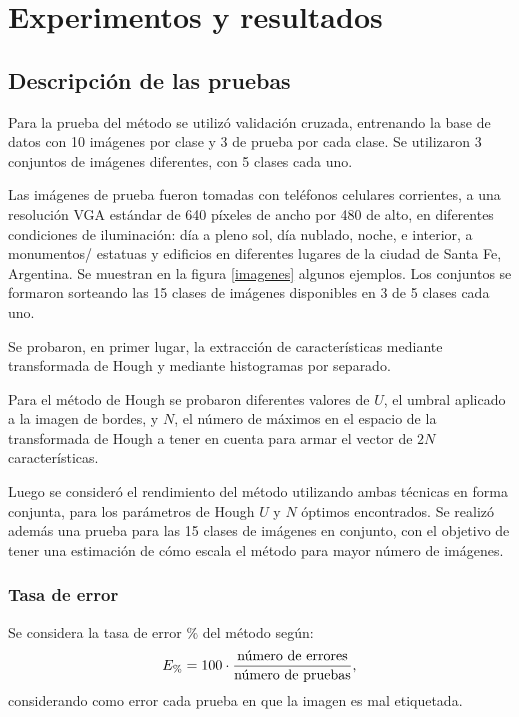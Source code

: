 \documentclass[conference,spanish,a4paper,10pt,oneside,final]{tfmpd}
\begin{document}
\section{Experimentos y resultados}
%
%
\subsection{Descripción de las pruebas}
Para la prueba del método se utilizó validación cruzada, entrenando la base de
datos con 10 imágenes por clase y 3 de prueba por cada clase. Se utilizaron
3 conjuntos de imágenes diferentes, con 5 clases cada uno.

Las imágenes de prueba fueron tomadas con teléfonos celulares corrientes, a una
resolución VGA estándar de 640 píxeles de ancho por 480 de alto, en
diferentes condiciones
de iluminación: día a pleno sol, día nublado, noche, e interior, a monumentos/%
estatuas y edificios en diferentes lugares de la ciudad de Santa Fe, Argentina.
Se muestran en la figura \ref{imagenes} algunos ejemplos.
Los conjuntos se formaron sorteando las 15 clases de imágenes disponibles en
3 de 5 clases cada uno.

Se probaron, en primer lugar, la extracción de características mediante
transformada de Hough y mediante histogramas por separado.

Para el método de Hough se probaron diferentes valores de $U$, el umbral
aplicado a la imagen de bordes, y $N$, el número de máximos en el espacio de
la transformada de Hough a tener en cuenta para armar el vector de $2N$
características.

Luego se consideró el rendimiento del método utilizando ambas técnicas en
forma conjunta, para los parámetros de Hough $U$ y $N$ óptimos encontrados.
Se realizó además una prueba para las 15 clases de imágenes en conjunto,
con el objetivo de tener una estimación de cómo escala el método para
mayor número de imágenes.

\subsubsection*{Tasa de error}
Se considera la tasa de error $\%$ del método según:
\begin{equation}
E_\%=100\cdot\frac{\textrm{número de errores}}{\textrm{número de pruebas}},
\end{equation}
considerando como error cada prueba en que la imagen es mal etiquetada.
\end{document}
